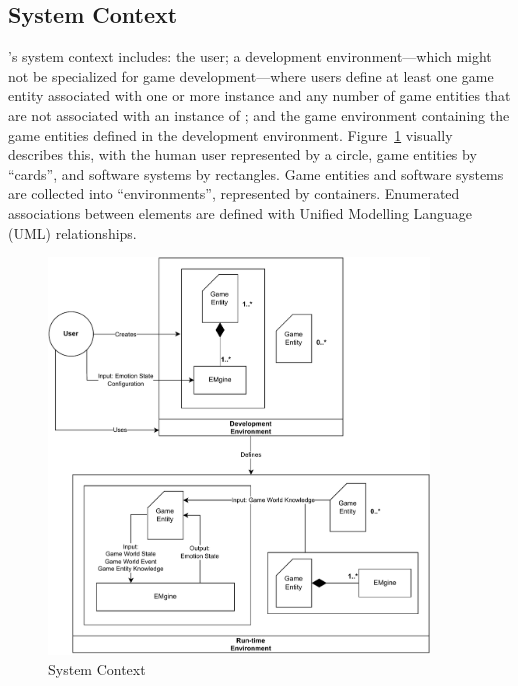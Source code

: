 \subsection{System Context}
\progname{}'s system context includes: the user; a development
environment---which might not be specialized for game development---where users
define at least one game entity associated with one or more \progname{}
instance and any number of game entities that are not associated with an
instance of \progname{}; and the game environment containing the game entities
defined in the development environment. Figure~\ref{fig_sysContext} visually
describes this, with the human user represented by a circle, game entities by
``cards'', and software systems by rectangles. Game entities and software
systems are collected into ``environments'', represented by containers.
Enumerated associations between elements are defined with Unified Modelling
Language (UML) relationships.

\begin{figure}[!ht]
    \centering
    \includegraphics[width=0.9\textwidth]{figures/systemContext_Revised.pdf}
    \caption{System Context}
    \label{fig_sysContext}
\end{figure}

